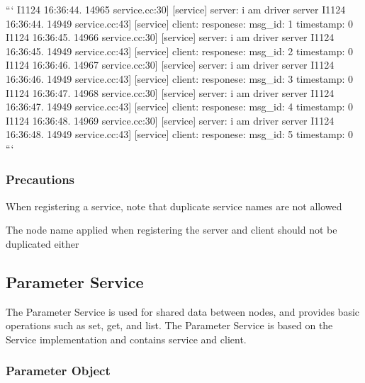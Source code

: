 ``` I1124 16\-:36\-:44. 14965 service.\-cc\-:30\mbox{]} \mbox{[}service\mbox{]} server\-: i am driver server I1124 16\-:36\-:44. 14949 service.\-cc\-:43\mbox{]} \mbox{[}service\mbox{]} client\-: responese\-: msg\-\_\-id\-: 1 timestamp\-: 0 I1124 16\-:36\-:45. 14966 service.\-cc\-:30\mbox{]} \mbox{[}service\mbox{]} server\-: i am driver server I1124 16\-:36\-:45. 14949 service.\-cc\-:43\mbox{]} \mbox{[}service\mbox{]} client\-: responese\-: msg\-\_\-id\-: 2 timestamp\-: 0 I1124 16\-:36\-:46. 14967 service.\-cc\-:30\mbox{]} \mbox{[}service\mbox{]} server\-: i am driver server I1124 16\-:36\-:46. 14949 service.\-cc\-:43\mbox{]} \mbox{[}service\mbox{]} client\-: responese\-: msg\-\_\-id\-: 3 timestamp\-: 0 I1124 16\-:36\-:47. 14968 service.\-cc\-:30\mbox{]} \mbox{[}service\mbox{]} server\-: i am driver server I1124 16\-:36\-:47. 14949 service.\-cc\-:43\mbox{]} \mbox{[}service\mbox{]} client\-: responese\-: msg\-\_\-id\-: 4 timestamp\-: 0 I1124 16\-:36\-:48. 14969 service.\-cc\-:30\mbox{]} \mbox{[}service\mbox{]} server\-: i am driver server I1124 16\-:36\-:48. 14949 service.\-cc\-:43\mbox{]} \mbox{[}service\mbox{]} client\-: responese\-: msg\-\_\-id\-: 5 timestamp\-: 0 ```

\subsubsection*{Precautions}


\begin{DoxyItemize}
\item When registering a service, note that duplicate service names are not allowed
\item The node name applied when registering the server and client should not be duplicated either
\end{DoxyItemize}

\subsection*{Parameter Service}

The Parameter Service is used for shared data between nodes, and provides basic operations such as {\ttfamily set}, {\ttfamily get}, and {\ttfamily list}. The Parameter Service is based on the {\ttfamily Service} implementation and contains service and client.

\subsubsection*{Parameter Object}

